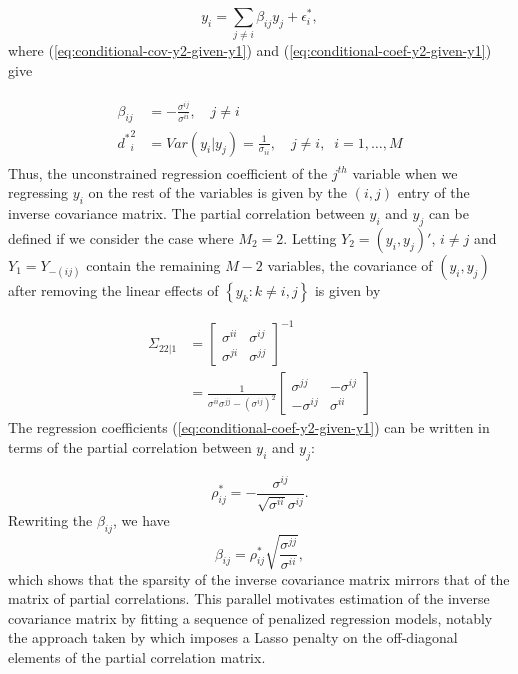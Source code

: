 \documentclass[../chapter-1-introduction.tex]{subfiles}
\begin{document}
\[
y_i = \sum_{j \ne i} \beta_{ij} y_j + \epsilon^*_i,
\] 
\noindent
where (\ref{eq:conditional-cov-y2-given-y1}) and (\ref{eq:conditional-coef-y2-given-y1}) give 

\begin{align}
 \begin{split} \label{eq:conditional-coef-y2-given-y1}
\beta_{ij} &= -\frac{\sigma^{ij}}{\sigma^{ii}}, \quad j \ne i \\
{d^*}_i^2 &= Var\left(y_i \vert y_j\right) =  \frac{1}{\sigma_{ii}},\quad j \ne i, \;\; i = 1,\dots, M
 \end{split}
\end{align}
\noindent
Thus, the unconstrained regression coefficient of the $j^{th}$ variable when we regressing $y_i$ on the rest of the variables is given by the $\left(i,j\right)$ entry of the inverse covariance matrix. The partial correlation between $y_i$ and $y_j$ can be defined if we consider the case where $M_2 = 2$. Letting $Y_2 = \left(y_i, y_j\right)'$, $i \ne j$ and $Y_1 = Y_{-\left(ij\right)}$ contain the remaining $M - 2$ variables, the covariance of $\left(y_i, y_j\right)$ after removing the linear effects of $\left\{ y_k : k \ne i,j\right\}$ is given by 

\begin{align*}
\Sigma_{22 \vert 1} &= \begin{bmatrix} \sigma^{ii} & \sigma^{ij} \\ \sigma^{ji} & \sigma^{jj} \end{bmatrix}^{-1} \\
&= \frac{1}{\sigma^{ii}\sigma^{jj} - \left(\sigma^{ij}\right)^2}\begin{bmatrix} \sigma^{jj} & -\sigma^{ij} \\ -\sigma^{ij} & \sigma^{ii}\end{bmatrix}
\end{align*}
\noindent
The regression coefficients (\ref{eq:conditional-coef-y2-given-y1}) can be written in terms of the partial correlation between $y_i$ and $y_j$:

\begin{equation} \label{eq:partial-correlation-coefficient}
\rho^*_{ij} = -\frac{\sigma^{ij}}{\sqrt{\sigma^{ii}}\sigma^{ij}}.
\end{equation}
\noindent
Rewriting the $\beta_{ij}$, we have
\begin{equation} \label{eq:partial-correlation-coefficient}
\beta_{ij} = \rho^*_{ij} \sqrt{\frac{\sigma^{jj}}{\sigma^{ii}}},
\end{equation}
\noindent
which shows that the sparsity of the inverse covariance matrix mirrors that of the matrix of partial correlations. This parallel motivates estimation of the inverse covariance matrix by fitting a sequence of penalized regression models, notably the  approach taken by \citet{peng2012partial} which imposes a Lasso penalty on the off-diagonal elements of the partial correlation matrix. 
 
\end{document}
